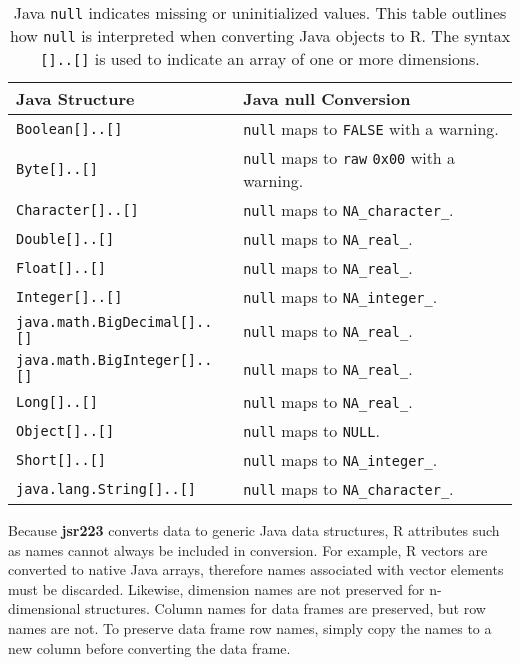 \documentclass[
article,
11pt, %
a4paper, %
oneside, %
headinclude,footinclude, %
]{scrartcl}
\theoremstyle{definition} %
\theoremstyle{plain} %
\theoremstyle{remark} %
\newcommand{\pkg}[1]{\textbf{#1}}
\newcommand{\code}[1]{\texttt{#1}}
\begin{document}
\begin{table}[t]
\centering
\begin{tabular}{@{}ll@{}}
\toprule
Java Structure                             & Java null Conversion   \\ \midrule
\code{Boolean[]..[]} & \code{null} maps to \code{FALSE} with a warning.  \\[.25cm]
\code{Byte[]..[]}       & \code{null} maps to \code{raw} \code{0x00} with a warning. \\[.25cm]
\code{Character[]..[]}  & \code{null} maps to \code{NA\_character\_}.   \\[.25cm]
\code{Double[]..[]}   & \code{null} maps to \code{NA\_real\_}.          \\[.25cm]
\code{Float[]..[]}     & \code{null} maps to \code{NA\_real\_}.        \\[.25cm]
\code{Integer[]..[]}     & \code{null} maps to \code{NA\_integer\_}.                  \\[.25cm]
\code{java.math.BigDecimal[]..[]}          & \code{null} maps to \code{NA\_real\_}.                     \\[.25cm]
\code{java.math.BigInteger[]..[]}          & \code{null} maps to \code{NA\_real\_}.                     \\[.25cm]
\code{Long[]..[]}       & \code{null} maps to \code{NA\_real\_}.                     \\[.25cm]
\code{Object[]..[]}                        & \code{null} maps to \code{NULL}.                           \\[.25cm]
\code{Short[]..[]}     & \code{null} maps to \code{NA\_integer\_}.                  \\[.25cm]
\code{java.lang.String[]..[]}              & \code{null} maps to \code{NA\_character\_}.                \\ \bottomrule
\end{tabular}
\caption{Java \code{null} indicates missing or uninitialized values. This table outlines how \code{null} is interpreted when converting Java objects to R. The syntax \code{[]..[]} is used to indicate an array of one or more dimensions.}
\label{tab:java-null-behavior}
\end{table}

Because \pkg{jsr223} converts data to generic Java data structures, R attributes such as names cannot always be included in conversion. For example, R vectors are converted to native Java arrays, therefore names associated with vector elements must be discarded. Likewise, dimension names are not preserved for n-dimensional structures. Column names for data frames are preserved, but row names are not. To preserve data frame row names, simply copy the names to a new column before converting the data frame.
\end{document}
